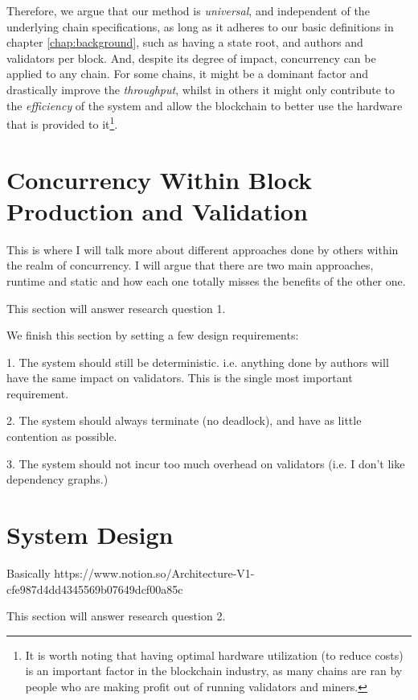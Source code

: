 Therefore, we argue that our method is \textit{universal}, and independent of the underlying chain
specifications, as long as it adheres to our basic definitions in chapter \ref{chap:background},
such as having a state root, and authors and validators per block. And, despite its degree of
impact, concurrency can be applied to any chain. For some chains, it might be a dominant factor and
drastically improve the \textit{throughput}, whilst in others it might only contribute to the
\textit{efficiency} of the system and allow the blockchain to better use the hardware that is
provided to it\footnote{It is worth noting that having optimal hardware utilization (to reduce
costs) is an important factor in the blockchain industry, as many chains are ran by people who are
making profit out of running validators and miners.}.


\section{Concurrency Within Block Production and Validation}

This is where I will talk more about different approaches done by others within the realm of
concurrency. I will argue that there are two main approaches, runtime and static and how each one
totally misses the benefits of the other one.

This section will answer research question 1.

We finish this section by setting a few design requirements:

1. The system should still be deterministic. i.e. anything done by authors will have the same impact
on validators. This is the single most important requirement.

2. The system should always terminate (no deadlock), and have as little contention as possible.

3. The system should not incur too much overhead on validators (i.e. I don't like dependency
graphs.)

\section{System Design} \label{chap_desgin:sec:design}

Basically https://www.notion.so/Architecture-V1-cfe987d4dd4345569b07649dcf00a85c

This section will answer research question 2.
